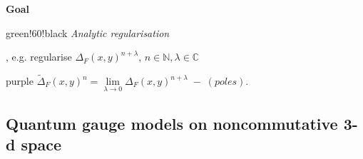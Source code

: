 \documentclass[a4paper,11pt]{beamer} %
\begin{document}
\begin{frame}
\begin{block}{\bf \color{purple} Goal}
\begin{footnotesize}
\vspace{1mm}
\begin{color}{green!60!black} \emph{Analytic regularisation} \end{color}, e.g. regularise $\Delta_F(x,y)^{n+\lambda}$, \; $n\in\mathbb{N}, \lambda\in\mathbb{C}$ \\
\vspace{-3mm}
\begin{center} \begin{color}{purple} $\tilde{\Delta}_F(x,y)^n = \underset{\lambda \to 0}{\lim} \Delta_{F}(x,y)^{n+\lambda} \; - \; (poles)$. \end{color} \end{center}
\end{footnotesize}
\end{block}
\end{frame}

\subsection{Quantum gauge models on noncommutative 3-d space}  
\end{document}
